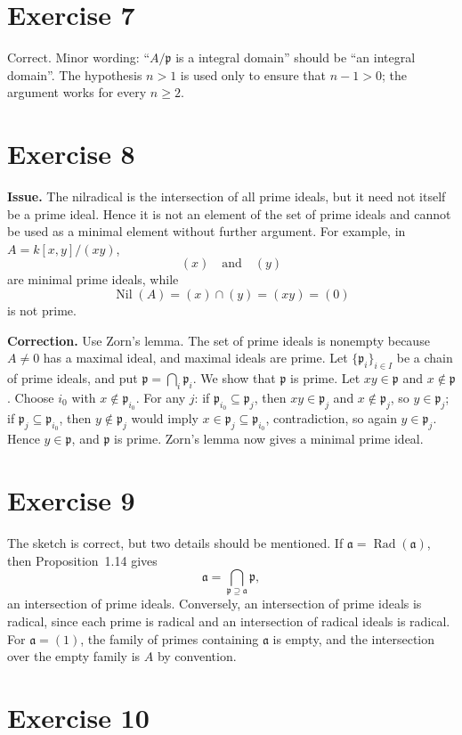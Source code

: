 \documentclass[11pt]{article}
\DeclareMathOperator{\Rad}{Rad}
\DeclareMathOperator{\Nil}{Nil}
\newcommand{\fp}{\mathfrak p}
\newcommand{\fa}{\mathfrak a}
\begin{document}
\section*{Exercise 7}

Correct.  Minor wording: ``\(A/\fp\) is a integral domain'' should be ``an
integral domain''.  The hypothesis \(n>1\) is used only to ensure that
\(n-1>0\); the argument works for every \(n\ge2\).

\section*{Exercise 8}

\textbf{Issue.}  The nilradical is the intersection of all prime ideals, but
it need not itself be a prime ideal.  Hence it is not an element of the set
of prime ideals and cannot be used as a minimal element without further
argument.  For example, in \(A=k[x,y]/(xy)\),
\[
(x)\quad\text{and}\quad(y)
\]
are minimal prime ideals, while
\[
\Nil(A)=(x)\cap(y)=(xy)=(0)
\]
is not prime.

\textbf{Correction.}  Use Zorn's lemma.  The set of prime ideals is nonempty
because \(A\neq0\) has a maximal ideal, and maximal ideals are prime.  Let
\(\{\fp_i\}_{i\in I}\) be a chain of prime ideals, and put
\(\fp=\bigcap_i\fp_i\).  We show that \(\fp\) is prime.  Let \(xy\in\fp\) and
\(x\notin\fp\).  Choose \(i_0\) with \(x\notin\fp_{i_0}\).  For any \(j\):
if \(\fp_{i_0}\subseteq\fp_j\), then \(xy\in\fp_j\) and
\(x\notin\fp_j\), so \(y\in\fp_j\); if \(\fp_j\subseteq\fp_{i_0}\), then
\(y\notin\fp_j\) would imply \(x\in\fp_j\subseteq\fp_{i_0}\), contradiction,
so again \(y\in\fp_j\).  Hence \(y\in\fp\), and \(\fp\) is prime.  Zorn's
lemma now gives a minimal prime ideal.

\section*{Exercise 9}

The sketch is correct, but two details should be mentioned.  If
\(\fa=\Rad(\fa)\), then Proposition~1.14 gives
\[
\fa=\bigcap_{\fp\supseteq\fa}\fp,
\]
an intersection of prime ideals.  Conversely, an intersection of prime ideals
is radical, since each prime is radical and an intersection of radical ideals
is radical.  For \(\fa=(1)\), the family of primes containing \(\fa\) is
empty, and the intersection over the empty family is \(A\) by convention.

\section*{Exercise 10}
\end{document}
